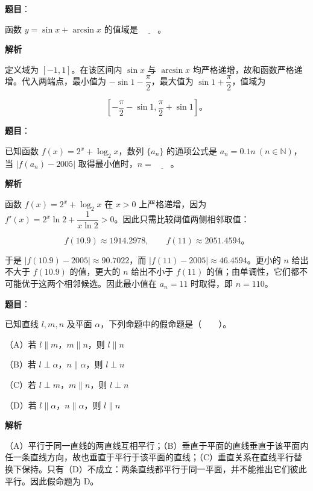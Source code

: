 \begin{answer}

\textbf{题目}：

函数 $y=\sin x+\arcsin x$ 的值域是 $\underline{\qquad}$。

\textbf{解析}

定义域为 $[-1,1]$。在该区间内 $\sin x$ 与 $\arcsin x$ 均严格递增，故和函数严格递增。代入两端点，最小值为 $-\sin1-\dfrac\pi2$，最大值为 $\sin1+\dfrac\pi2$，值域为

\nopagebreak[4]
\[
\left[-\frac\pi2-\sin1,\frac\pi2+\sin1\right]\mbox{。}
\]


\end{answer}
\begin{answer}

\textbf{题目}：

已知函数 $f(x)=2^x+\log_2 x$，数列 $\{a_n\}$ 的通项公式是 $a_n=0.1n\ (n\in\mathbb N)$，当 $\mbox{$\lvert f(a_n)-2005\rvert$}$ 取得最小值时，$n=\underline{\qquad}$。

\textbf{解析}

函数 $f(x)=2^x+\log_2x$ 在 $x>0$ 上严格递增，因为 $f'(x)=2^x\ln2+\dfrac1{x\ln2}>0$。因此只需比较阈值两侧相邻取值：

\nopagebreak[4]
\[
f(10.9)\approx1914.2978,\qquad f(11)\approx2051.4594\mbox{。}
\]

于是 $|f(10.9)-2005|\approx90.7022$，而 $|f(11)-2005|\approx46.4594$。更小的 $n$ 给出不大于 $f(10.9)$ 的值，更大的 $n$ 给出不小于 $f(11)$ 的值；由单调性，它们都不可能优于这两个相邻候选。因此最小值在 $a_n=11$ 时取得，即 $n=110$。


\end{answer}
\begin{answer}

\textbf{题目}：

已知直线 $l,m,n$ 及平面 $\alpha$，下列命题中的假命题是\mbox{（　　）}。

（A）若 $l\parallel m$，$m\parallel n$，则 $l\parallel n$

（B）若 $l\perp\alpha$，$n\parallel\alpha$，则 $l\perp n$

（C）若 $l\perp m$，$m\parallel n$，则 $l\perp n$

（D）若 $l\parallel\alpha$，$n\parallel\alpha$，则 $l\parallel n$

\textbf{解析}

（A）平行于同一直线的两直线互相平行；（B）垂直于平面的直线垂直于该平面内任一条直线方向，故也垂直于平行于该平面的直线；（C）垂直关系在直线平行替换下保持。只有（D）不成立：两条直线都平行于同一平面，并不能推出它们彼此平行。因此假命题为 D。


\end{answer}
